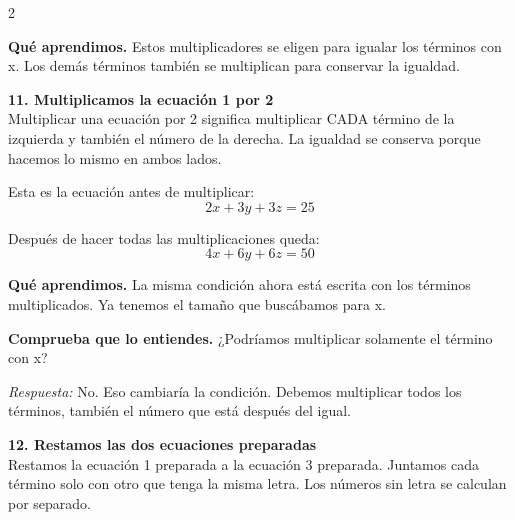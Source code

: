 \documentclass[11pt,a4paper,landscape]{article}
\begin{document}
\begin{multicols*}{2}
\begin{minipage}{\linewidth}
\par\smallskip\textbf{Qué aprendimos.} Estos multiplicadores se eligen para igualar los términos con x. Los demás términos también se multiplican para conservar la igualdad.
\end{minipage}\par\medskip
\noindent\begin{minipage}{\linewidth}\textbf{11. Multiplicamos la ecuación 1 por 2}\\[2pt]Multiplicar una ecuación por 2 significa multiplicar CADA término de la izquierda y también el número de la derecha. La igualdad se conserva porque hacemos lo mismo en ambos lados.
\par\smallskip Esta es la ecuación antes de multiplicar:
\[2x + 3y + 3z = 25\]
\par{}\par\smallskip
\par\smallskip Después de hacer todas las multiplicaciones queda:
\[4x + 6y + 6z = 50\]
\par\smallskip\textbf{Qué aprendimos.} La misma condición ahora está escrita con los términos multiplicados. Ya tenemos el tamaño que buscábamos para x.
\par\smallskip\textbf{Comprueba que lo entiendes.} ¿Podríamos multiplicar solamente el término con x?\par\textit{Respuesta:} No. Eso cambiaría la condición. Debemos multiplicar todos los términos, también el número que está después del igual.
\end{minipage}\par\medskip
\noindent\begin{minipage}{\linewidth}\textbf{12. Restamos las dos ecuaciones preparadas}\\[2pt]Restamos la ecuación 1 preparada a la ecuación 3 preparada. Juntamos cada término solo con otro que tenga la misma letra. Los números sin letra se calculan por separado.

\end{minipage}
\end{multicols*}
\end{document}
